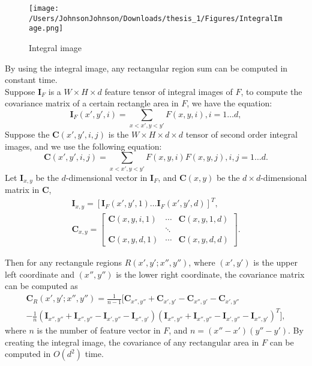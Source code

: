 \begin{figure}[H]
\centering
\texttt{[image: /Users/JohnsonJohnson/Downloads/thesis\_1/Figures/IntegralImage.png]}
\caption{Integral image}
\vspace{0em}
\end{figure} 
By using the integral image, any rectangular region sum can be computed in constant time. \\
\indent Suppose $\bm{I}_F$ is a $W\times H\times d$ feature tensor of integral images of $F$, to compute the covariance matrix of a certain rectangle area in $F$, we have the equation:
\begin{equation}
 \bm{I}_F(x', y', i) = \sum_{x < x', y < y'}F(x, y ,i), i = 1 \dots d,
\end{equation} 
Suppose the $\bm{C}(x', y', i, j)$ is the $W\times H\times d\times d$ tensor of second order integral images, and we use the following equation:
\begin{equation}
\bm{C}(x', y', i, j) = \sum_{x<x', y<y'} F(x, y, i)F(x, y, j), i, j = 1 \dots d.
\end{equation}
Let $\bm{I}_{x, y}$ be the $d$-dimensional vector in $\bm{I}_F$, and $\bm{C}(x, y)$ be the $d\times d$-dimensional matrix in $\bm{C}$, 
\begin{equation}
\begin{aligned}
\bm{I}_{x, y} = [ \bm{I}_F(x', y', 1) \dots  \bm{I}_F(x', y', d)]^T, \\
 \bm{C}_{x, y} = \left [
 \begin{matrix} 
 \bm{C}(x, y, i, 1)  &\cdots & \bm{C}(x, y, 1, d)\\
 			     & \ddots &			        \\
\bm{C}(x, y, d, 1)   & \cdots &\bm{C}(x, y, d, d)
 
 \end{matrix} \right ].
 \end{aligned}
\end{equation}

Then for any rectangule regions $R(x', y'; x'', y'')$, where $(x', y')$ is the upper left coordinate and $(x'', y'')$ is the lower right coordinate, the covariance matrix can be computed as 
\begin{equation}
\begin{aligned}
\bm{C}_R(x', y'; x'', y'') = \frac{1}{n-1} [\bm{C}_{x'', y''} + \bm{C}_{x', y'} -  \bm{C}_{x'', y'}-  \bm{C}_{x', y''} \\
-\frac{1}{n}(\bm{I}_{x'', y''} + \bm{I}_{x'', y''} - \bm{I}_{x', y''} - \bm{I}_{x'', y'})(\bm{I}_{x'', y''} + \bm{I}_{x'', y''} - \bm{I}_{x', y''} - \bm{I}_{x'', y'})^T],
\end{aligned}
\end{equation}
where $n$ is the number of feature vector in $F$, and $n = (x'' - x')(y'' - y')$. By creating the integral image, the covariance of any rectangular area in $F$ can be computed in $O(d^2)$ time.

